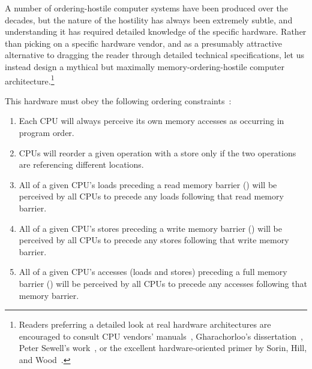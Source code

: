 A number of ordering-hostile computer systems have been produced over
the decades,
but the nature of the hostility has always been extremely subtle,
and understanding it has required detailed knowledge of the specific
hardware.
Rather than picking on a specific hardware vendor, and as a presumably
attractive alternative to dragging the reader through detailed
technical specifications, let us instead design a mythical but maximally
memory-ordering-hostile computer architecture.\footnote{
	Readers preferring a detailed look at real hardware
	architectures are encouraged to consult CPU vendors'
	manuals~\cite{ALPHA95,AMDOpteron02,IntelItanium02v2,PowerPC94,MichaelLyons05a,SPARC94,IntelXeonV3-96a,IntelXeonV2b-96a,IBMzSeries04a},
	Gharachorloo's dissertation~\cite{Gharachorloo95},
	Peter Sewell's work~\cite{PeterSewell2021weakmemory}, or
	the excellent hardware-oriented primer by
	Sorin, Hill, and Wood~\cite{DanielJSorin2011MemModel}.}

This hardware must obey the following ordering
constraints~\cite{PaulMcKenney2005i,PaulMcKenney2005j}:
\begin{enumerate}
\item	Each CPU will always perceive its own memory accesses
	as occurring in program order.
\item	CPUs will reorder a given operation with a store only
	if the two operations are referencing different locations.
\item	All of a given CPU's loads preceding a read memory barrier
	() will be perceived by all CPUs to precede
	any loads following that read memory barrier.
\item	All of a given CPU's stores preceding a write memory barrier
	() will be perceived by all CPUs to precede
	any stores following that write memory barrier.
\item	All of a given CPU's accesses (loads and stores) preceding a
	full memory barrier
	() will be perceived by all CPUs to precede
	any accesses following that memory barrier.
\end{enumerate}

\QuickQuizEnd

